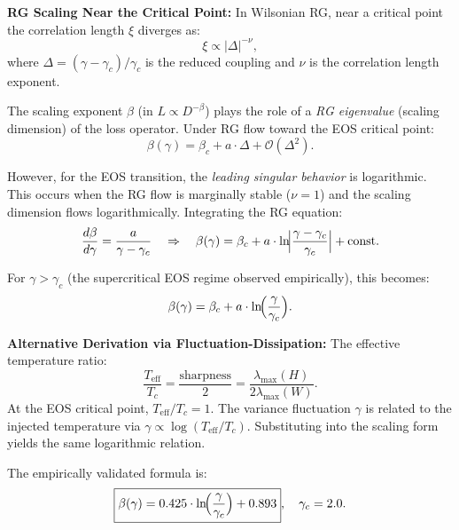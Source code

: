 \documentclass[11pt, a4paper]{article}
\theoremstyle{plain}
\begin{document}
\medskip\noindent\textbf{RG Scaling Near the Critical Point:} In Wilsonian RG, near a critical point the correlation length $\xi$ diverges as:
\begin{equation}
\xi \propto |\Delta|^{-\nu},
\end{equation}
where $\Delta = (\gamma - \gamma_c)/\gamma_c$ is the reduced coupling and $\nu$ is the correlation length exponent.

The scaling exponent $\beta$ (in $L \propto D^{-\beta}$) plays the role of a \emph{RG eigenvalue} (scaling dimension) of the loss operator. Under RG flow toward the EOS critical point:
\begin{equation}
\beta(\gamma) = \beta_c + a \cdot \Delta + \mathcal{O}(\Delta^2).
\end{equation}

However, for the EOS transition, the \emph{leading singular behavior} is logarithmic. This occurs when the RG flow is marginally stable ($\nu = 1$) and the scaling dimension flows logarithmically. Integrating the RG equation:
\begin{equation}
\frac{d\beta}{d\gamma} = \frac{a}{\gamma - \gamma_c} \quad \Rightarrow \quad \beta(\gamma) = \beta_c + a \cdot \ln\!\Bigl|\frac{\gamma - \gamma_c}{\gamma_c}\Bigr| + \mathrm{const}.
\end{equation}

For $\gamma > \gamma_c$ (the supercritical EOS regime observed empirically), this becomes:
\begin{equation}
\beta(\gamma) = \beta_c + a \cdot \ln\!\Bigl(\frac{\gamma}{\gamma_c}\Bigr).
\end{equation}

\medskip\noindent\textbf{Alternative Derivation via Fluctuation-Dissipation:} The effective temperature ratio:
\begin{equation}
\frac{T_{\mathrm{eff}}}{T_c} = \frac{\mathrm{sharpness}}{2} = \frac{\lambda_{\max}(H)}{2\lambda_{\max}(W)}.
\end{equation}
At the EOS critical point, $T_{\mathrm{eff}}/T_c = 1$. The variance fluctuation $\gamma$ is related to the injected temperature via $\gamma \propto \log(T_{\mathrm{eff}}/T_c)$. Substituting into the scaling form yields the same logarithmic relation.

The empirically validated formula is:
\begin{equation}
\boxed{\beta(\gamma) = 0.425 \cdot \ln\!\Bigl(\frac{\gamma}{\gamma_c}\Bigr) + 0.893}, \quad \gamma_c = 2.0.
\end{equation}
\end{document}
